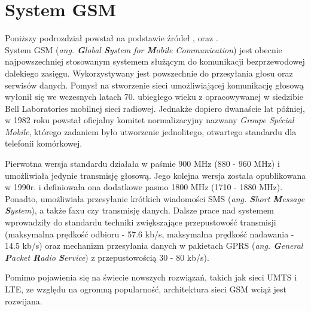 \section{System GSM}
\label{GSM}

Poniższy podrozdział powstał na podstawie źródeł \cite{GSM}, \cite{GSM_tutorialspoint} oraz \cite{GSM_wiki}.\\

System GSM (\textit{ang. \textbf{G}lobal \textbf{S}ystem for \textbf{M}obile Communication}) jest obecnie najpowszechniej stosowanym systemem służącym do komunikacji bezprzewodowej dalekiego zasięgu. Wykorzystywany jest powszechnie do przesyłania głosu oraz serwisów danych. Pomysł na stworzenie sieci umożliwiającej komunikację głosową wyłonił się we wczesnych latach 70. ubiegłego wieku z opracowywanej w siedzibie Bell Laboratories mobilnej sieci radiowej. Jednakże dopiero dwanaście lat później, w 1982 roku powstał oficjalny komitet normalizacyjny nazwany \textit{Groupe Spécial Mobile}, którego zadaniem było utworzenie jednolitego, otwartego standardu dla telefonii komórkowej. 

Pierwotna wersja standardu działała w paśmie 900 MHz (880 - 960 MHz) i umożliwiała jedynie transmisję głosową. Jego kolejna wersja została opublikowana w 1990r. i definiowała ona dodatkowe pasmo 1800 MHz (1710 - 1880 MHz). Ponadto, umożliwiała przesyłanie krótkich wiadomości SMS (\textit{ang. \textbf{S}hort \textbf{M}essage \textbf{S}ystem}), a także faxu czy transmisję danych. Dalsze prace nad systemem wprowadziły do standardu techniki zwiększające przepustowość transmisji (maksymalna prędkość odbioru - 57.6 kb/s, maksymalna prędkość nadawania - 14.5 kb/s) oraz mechanizm przesyłania danych w pakietach GPRS (\textit{ang. \textbf{G}eneral \textbf{P}acket \textbf{R}adio \textbf{S}ervice}) z przepustowością 30 - 80 kb/s). 

Pomimo pojawienia się na świecie nowszych rozwiązań, takich jak sieci UMTS i LTE, ze względu na ogromną popularność, architektura sieci GSM wciąż jest rozwijana. 

